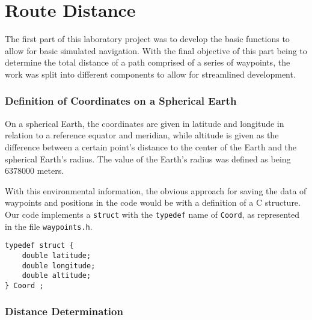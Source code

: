 \documentclass{article}
\begin{document}
\part{Route Distance}

The first part of this laboratory project was to develop the basic functions to allow for basic simulated navigation. With the final objective of this part being to determine the total distance of a path comprised of a series of waypoints, the work was split into different components to allow for streamlined development.

\section{Definition of Coordinates on a Spherical Earth}

On a spherical Earth, the coordinates are given in latitude and longitude in relation to a reference equator and meridian, while altitude is given as the difference between a certain point's distance to the center of the Earth and the spherical Earth's radius. The value of the Earth's radius was defined as being $6378000$ meters.

With this environmental information, the obvious approach for saving the data of waypoints and positions in the code would be with a definition of a C structure. Our code implements a \texttt{struct} with the \texttt{typedef} name of \texttt{Coord}, as represented in the file \texttt{waypoints.h}.
\begin{verbatim}
typedef struct {
    double latitude;
    double longitude;
    double altitude;
} Coord ;
\end{verbatim}

\section{Distance Determination} \label{sec:dist_det}
\end{document}
